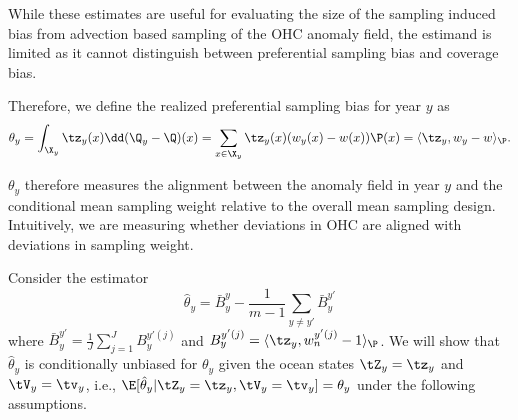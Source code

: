 While these estimates are useful for evaluating the size of the sampling induced bias from advection based sampling of the OHC anomaly field, the estimand is limited as it cannot distinguish between preferential sampling bias and coverage bias. 

Therefore, we define the realized preferential sampling bias for year $y$ as
\begin{equation}
  \theta_y = \int_{\X_y} \tz_y(x)\dd(\Q_{y} - \Q)(x) =  \sum_{x\in\X_y}\tz_y(x)(w_y(x) - w(x))\P(x) = \langle\tz_y,w_y - w\rangle_{\P} .
\end{equation}

$\theta_y$ therefore measures the alignment between the anomaly field in year $y$ and the conditional mean sampling weight relative to the overall mean sampling design. Intuitively, we are measuring whether deviations in OHC are aligned with deviations in sampling weight.

Consider the estimator 
\begin{equation}
  \hat\theta_y = \bar{B}_y^{y} - \frac{1}{m-1}\sum_{y \ne y'}\bar{B}_y^{y'}
\end{equation}
where $\bar{B}_y^{y'} = \frac1J\sum_{j=1}^J B_y^{y'(j)}$ and $B_y^{y'(j)} = \langle\tz_y,w_n^{y'(j)} - 1 \rangle_{\P}$.
We will show that $\hat\theta_y$ is conditionally unbiased for $\theta_y$ given the ocean states $\tZ_y = \tz_y$ and $\tV_y = \tv_y$, i.e., $\E[\hat\theta_y | \tZ_y = \tz_y, \tV_y = \tv_y] = \theta_y$ under the following assumptions.

